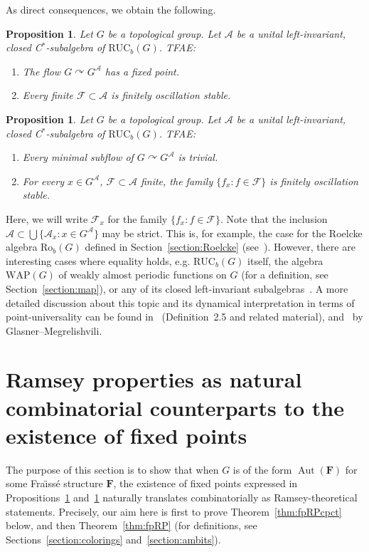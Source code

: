 \documentclass[11pt]{article}
\newtheorem{prop}[theo]{Proposition}
\theoremstyle{definition}
\numberwithin{equation}{section}
\numberwithin{figure}{section}
\numberwithin{table}{section}
\newcommand{\A}{\mathcal A}
\newcommand*{\mF}{\mathbf{F}}
\DeclareMathOperator{\Aut}{Aut}
\newcommand{\actson}{\curvearrowright}
\newcommand{\RUCB}{\mathrm{RUC}_{b}}
\newcommand{\ROB}{\mathrm{Ro}_{b}}
\newcommand{\WAP}{\mathrm{WAP}}
\begin{document}
As direct consequences, we obtain the following.

\begin{prop}\label{cor:fp}
Let $G$ be a topological group. Let $\A$ be a unital left-invariant, closed C$^{*}$-subalgebra of $\RUCB(G)$. TFAE:
\begin{enumerate}
\item The flow $G\actson G^{\A}$ has a fixed point.
\item Every finite $\mathcal F\subset \A$ is finitely oscillation stable.
\end{enumerate}
\end{prop}

\begin{prop}\label{cor:trivialmin}
Let $G$ be a topological group. Let $\A$ be a unital left-invariant, closed C$^{*}$-subalgebra of $\RUCB(G)$. TFAE:
\begin{enumerate}
\item Every minimal subflow of $G\actson G^{\A}$ is trivial.
\item For every $x\in G^{\A}$, $\mathcal F\subset \A$ finite, the family $\{ f_{x}:f\in \mathcal F\}$ is finitely oscillation stable.
\end{enumerate}
\end{prop}

Here, we will write $\mathcal F_{x}$ for the family $\{ f_{x}:f\in \mathcal F\}$. Note that the inclusion $\A\subset \bigcup\{\A_{x}:x\in G^{\A}\}$ may be strict. This is, for example, the case for the Roelcke algebra $\ROB(G)$ defined in Section~\ref{section:Roelcke} (see~\cite[Corollary~4.11]{GlM2}). However, there are interesting cases where equality holds, e.g. $\RUCB(G)$ itself, the algebra $\WAP(G)$ of weakly almost periodic functions on $G$ (for a definition, see Section~\ref{section:map}), or any of its closed left-invariant subalgebras~\cite[Chapter~III, Lemma~8.8]{BJM}. A more detailed discussion about this topic and its dynamical interpretation in terms of point-universality can be found in~\cite{GlM1} (Definition~2.5 and related material), \cite[Sections~3 and 4]{GlM2} and~\cite[Remarks 4.15 and 4.16]{GlM3} by Glasner--Megrelishvili.


\section{Ramsey properties as natural combinatorial counterparts to the existence of fixed points}
\label{section:RPfp}

The purpose of this section is to show that when $G$ is of the form $\Aut(\mF)$ for some Fra\"{\i}ss\'e structure $\mF$, the existence of fixed points expressed in Propositions~\ref{cor:fp} and~\ref{cor:trivialmin} naturally translates combinatorially as Ramsey-theoretical statements. Precisely, our aim here is first to prove Theorem~\ref{thm:fpRPcpct} below, and then Theorem~\ref{thm:fpRP} (for definitions, see Sections~\ref{section:colorings} and~\ref{section:ambits}).
\end{document}
